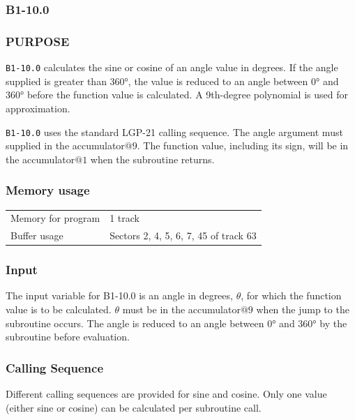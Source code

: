 \documentclass{article}
\begin{document}
\subsubsection*{B1-10.0}

\subsubsection*{PURPOSE}
\texttt{B1-10.0} calculates the sine or cosine of an angle value in degrees. If the angle supplied is greater than 360°, the value is reduced to an angle between 0° and 360° before the function value is calculated. A 9th-degree polynomial is used for approximation.

\texttt{B1-10.0} uses the standard LGP-21 calling sequence. The angle argument must supplied in the accumulator$@9$. The function value, including its sign, will be in the accumulator$@1$ when the subroutine returns.

\subsubsection*{Memory usage}
\begin{center}
\begin{tabular}{ll}
    \toprule
    Memory for program & 1 track \\
    Buffer usage & Sectors 2, 4, 5, 6, 7, 45 of track 63 \\
    \bottomrule
\end{tabular}
\end{center}

\subsubsection*{Input}
The input variable for B1-10.0 is an angle in degrees, $\theta$, for which the function value is to be calculated. $\theta$ must be in the accumulator$@9$ when the jump to the subroutine occurs. The angle is reduced to an angle between 0° and 360° by the subroutine before evaluation.

\subsubsection*{Calling Sequence}
Different calling sequences are provided for sine and cosine. Only one value (either sine or cosine) can be calculated per subroutine call.
\end{document}
